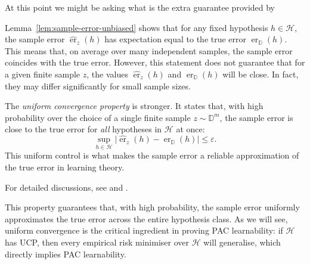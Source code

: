 At this point we might be asking what is the extra guarantee provided by

\begin{remark}
    Lemma~\ref{lem:sample-error-unbiased} shows that for any fixed hypothesis $h \in \mathcal{H}$, the sample error
    $\hat{\operatorname{er}}_{z}(h)$ has expectation equal to the true error $\operatorname{er}_{\mathbb{D}}(h)$.
    This means that, on average over many independent samples, the sample error coincides with the true error.
    However, this statement does not guarantee that for a given finite sample $z$, the values
    $\hat{\operatorname{er}}_{z}(h)$ and $\operatorname{er}_{\mathbb{D}}(h)$ will be close.
    In fact, they may differ significantly for small sample sizes.

    The \emph{uniform convergence property} is stronger. It states that, with high probability over the choice of a single
    finite sample $z \sim \mathbb{D}^m$, the sample error is close to the true error for \emph{all} hypotheses in $\mathcal{H}$
    at once:
    \[
        \sup_{h \in \mathcal{H}} \bigl|\hat{\operatorname{er}}_{z}(h) - \operatorname{er}_{\mathbb{D}}(h)\bigr| \leq \varepsilon.
    \]
    This uniform control is what makes the sample error a reliable approximation of the true error in learning theory.

    For detailed discussions, see \cite[Sec.~3.1]{ShalevShwartzBenDavid2014} and \cite[Chap.~2]{AnthonyBartlett2009}.
\end{remark}

\noindent
This property guarantees that, with high probability, the sample error uniformly approximates the true error across the entire hypothesis class. As we will see, uniform convergence is the critical ingredient in proving PAC learnability: if $\mathcal{H}$ has UCP, then every empirical risk minimiser over $\mathcal{H}$ will generalise, which directly implies PAC learnability.

